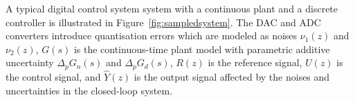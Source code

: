 \documentclass{sig-alternate-05-2015}
\begin{document}

A typical digital control system system with a continuous plant and a discrete
controller is illustrated in Figure~\ref{fig:sampledsystem}.  The DAC and
ADC converters introduce quantisation errors which are modeled as noises $\nu_{1}(z)$ and $\nu_{2}(z)$,
$G(s)$ is the continuous-time plant model with parametric additive
uncertainty $\Delta_p{G}_n(s)$ and $\Delta_p{G}_d(s)$, $R(z)$ is the reference signal, $U(z)$ is
the control signal, and $\hat{Y}(z)$ is the output signal affected by the
noises and uncertainties in the closed-loop system.
\end{document}
